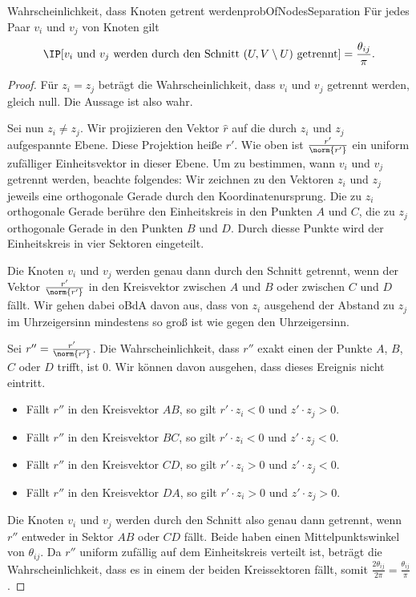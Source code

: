\documentclass[language=ngerman,algolist]{TemplateLecture}
\begin{document}
\begin{lem}{Wahrscheinlichkeit, dass Knoten getrent werden}{probOfNodesSeparation}
    Für jedes Paar $v_i$ und $v_j$ von Knoten gilt 
    \begin{equation*}
        \IP[\text{$v_i$ und $v_j$ werden durch den Schnitt $(U, V \setminus U)$ getrennt}] = \frac{\theta_{ij}}{\pi}.
    \end{equation*}
\end{lem}

\begin{proof}
    Für $z_i = z_j$ beträgt die Wahrscheinlichkeit, dass $v_i$ und $v_j$ getrennt werden, gleich null. Die Aussage ist also wahr.

    Sei nun $z_i \neq z_j$. Wir projizieren den Vektor $\hat{r}$ auf die durch $z_i$ und $z_j$ aufgespannte Ebene. Diese Projektion heiße $r'$. Wie oben ist $\frac{r'}{\norm{r'}}$ ein uniform zufälliger Einheitsvektor in dieser Ebene. Um zu bestimmen, wann $v_i$ und $v_j$ getrennt werden, beachte folgendes: Wir zeichnen zu den Vektoren $z_i$ und $z_j$ jeweils eine orthogonale Gerade durch den Koordinatenursprung. Die zu $z_i$ orthogonale Gerade berühre den Einheitskreis in den Punkten $A$ und $C$, die zu $z_j$ orthogonale Gerade in den Punkten $B$ und $D$. Durch diesse Punkte wird der Einheitskreis in vier Sektoren eingeteilt.
    
    Die Knoten $v_i$ und $v_j$ werden genau dann durch den Schnitt getrennt, wenn der Vektor $\frac{r'}{\norm{r'}}$ in den Kreisvektor zwischen $A$ und $B$ oder zwischen $C$ und $D$ fällt. Wir gehen dabei oBdA davon aus, dass von $z_i$ ausgehend der Abstand zu $z_j$ im Uhrzeigersinn mindestens so groß ist wie gegen den Uhrzeigersinn.

    Sei $r'' = \frac{r'}{\norm{r'}}$. Die Wahrscheinlichkeit, dass $r''$ exakt einen der Punkte $A$, $B$, $C$ oder $D$ trifft, ist $0$. Wir können davon ausgehen, dass dieses Ereignis nicht eintritt.
    \begin{itemize}
        \item Fällt $r''$ in den Kreisvektor $AB$, so gilt $r' \cdot z_i < 0$ und $z' \cdot z_j > 0$.
        \item Fällt $r''$ in den Kreisvektor $BC$, so gilt $r' \cdot z_i < 0$ und $z' \cdot z_j < 0$.
        \item Fällt $r''$ in den Kreisvektor $CD$, so gilt $r' \cdot z_i > 0$ und $z' \cdot z_j < 0$.
        \item Fällt $r''$ in den Kreisvektor $DA$, so gilt $r' \cdot z_i > 0$ und $z' \cdot z_j > 0$.
    \end{itemize}
    Die Knoten $v_i$ und $v_j$ werden durch den Schnitt also genau dann getrennt, wenn $r''$ entweder in Sektor $AB$ oder $CD$ fällt. Beide haben einen Mittelpunktswinkel von $\theta_{ij}$. Da $r''$ uniform zufällig auf dem Einheitskreis verteilt ist, beträgt die Wahrscheinlichkeit, dass es in einem der beiden Kreissektoren fällt, somit $\frac{2\theta_{ij}}{2\pi} = \frac{\theta_{ij}}{\pi}$.
\end{proof}
\end{document}
